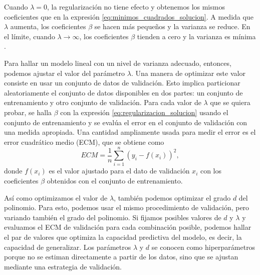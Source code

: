 \documentclass{article}
\begin{document}

Cuando $\lambda = 0$, la regularización no tiene efecto y obtenemos los mismos coeficientes que en la expresión \ref{eq:minimos_cuadrados_solucion}. A medida que $\lambda$ aumenta, los coeficientes $\beta$ se hacen más pequeños y la varianza se reduce. En el límite, cuando $\lambda \to \infty$, los coeficientes $\beta$ tienden a cero y la varianza es mínima \citep{james2013introduction}. 

Para hallar un modelo lineal con un nivel de varianza adecuado, entonces, podemos ajustar el valor del parámetro $\lambda$. Una manera de optimizar este valor consiste en usar un conjunto de datos de validación. Esto implica particionar aleatoriamente el conjunto de datos disponibles en dos partes: un conjunto de entrenamiento y otro conjunto de validación. Para cada valor de $\lambda$ que se quiera probar, se halla $\beta$ con la expresión \ref{eq:regularizacion_solucion} usando el conjunto de entrenamiento y se evalúa el error en el conjunto de validación con una medida apropiada. Una cantidad ampliamente usada para medir el error es el error cuadrático medio (ECM), que se obtiene como
%
\begin{equation} \label{eq:ecm}
    ECM = \frac{1}{n} \sum_{i=1}^n (y_i - f(x_i))^2,
\end{equation}
%
donde $f(x_i)$ es el valor ajustado para el dato de validación $x_i$ con los coeficientes $\beta$ obtenidos con el conjunto de entrenamiento. 

Así como optimizamos el valor de $\lambda$, también podemos optimizar el grado $d$ del polinomio. Para esto, podemos usar el mismo procedimiento de validación, pero variando también el grado del polinomio. Si fijamos posibles valores de $d$ y $\lambda$ y evaluamos el ECM de validación para cada combinación posible, podemos hallar el par de valores que optimiza la capacidad predictiva del modelo, es decir, la capacidad de generalizar. Los parámetros $\lambda$ y $d$ se conocen como hiperparámetros porque no se estiman directamente a partir de los datos, sino que se ajustan mediante una estrategia de validación.

\end{document}
